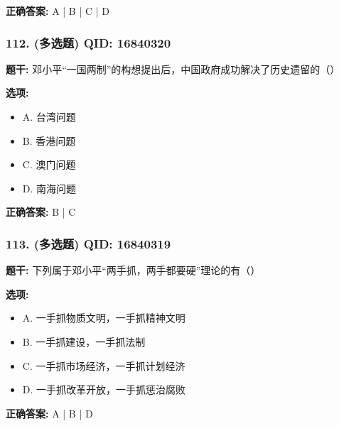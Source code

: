 \documentclass[12pt,UTF8]{ctexart}
\begin{document}
\textbf{正确答案:}
A | B | C | D

\vspace{0.3em}\hrulefill\vspace{0.7em}

\subsubsection*{112. (多选题) \small QID: 16840320}

\textbf{题干:}
邓小平“一国两制”的构想提出后，中国政府成功解决了历史遗留的（）

\textbf{选项:}
\begin{itemize}[leftmargin=*]

  \item A. 台湾问题

  \item B. 香港问题

  \item C. 澳门问题

  \item D. 南海问题

\end{itemize}

\textbf{正确答案:}
B | C

\vspace{0.3em}\hrulefill\vspace{0.7em}

\subsubsection*{113. (多选题) \small QID: 16840319}

\textbf{题干:}
下列属于邓小平“两手抓，两手都要硬”理论的有（）

\textbf{选项:}
\begin{itemize}[leftmargin=*]

  \item A. 一手抓物质文明，一手抓精神文明

  \item B. 一手抓建设，一手抓法制

  \item C. 一手抓市场经济，一手抓计划经济

  \item D. 一手抓改革开放，一手抓惩治腐败

\end{itemize}

\textbf{正确答案:}
A | B | D

\vspace{0.3em}\hrulefill\vspace{0.7em}
\end{document}
